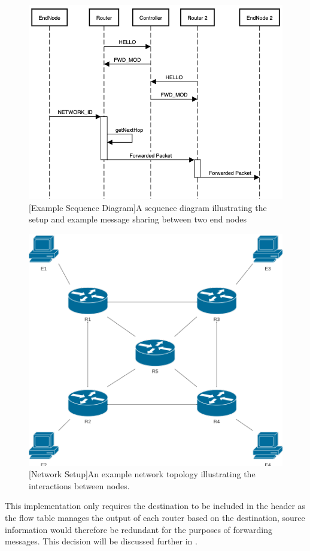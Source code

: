 \documentclass{article}
\begin{document}
\begin{figure}[!ht]
	\centering
	\begin{minipage}{.5\textwidth}
		\centering
		\includegraphics[width=0.8\linewidth]{ExampleSequence.png}
		\captionsetup{width=.6\linewidth}
		[Example Sequence Diagram]{A sequence diagram illustrating the setup and example message sharing between two end nodes}
		\label{fig:ex_seq}
	\end{minipage}%
	\begin{minipage}{.5\textwidth}
		\centering
		\includegraphics[width=0.8\linewidth]{NetworkDiagram.png}
		\captionsetup{width=.6\linewidth}
		[Network Setup]{An example network topology illustrating the interactions between nodes.}
		\label{fig:network_diagram}
	\end{minipage}
\end{figure}
This implementation only requires the destination to be included in the header as the flow table manages the output of each router based on the destination, source information would therefore be redundant for the purposes of forwarding messages. This decision will be discussed further in . 
\end{document}
